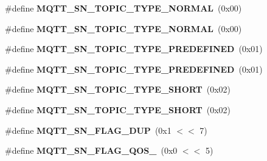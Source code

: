 \begin{DoxyCompactItemize}
\item 
\hypertarget{group__MQTT__SN__CONTROL_ga206c51c6b01cdf9347809ebfc03caaef}{\#define {\bfseries M\+Q\+T\+T\+\_\+\+S\+N\+\_\+\+T\+O\+P\+I\+C\+\_\+\+T\+Y\+P\+E\+\_\+\+N\+O\+R\+M\+A\+L}~(0x00)}\label{group__MQTT__SN__CONTROL_ga206c51c6b01cdf9347809ebfc03caaef}

\item 
\hypertarget{group__MQTT__SN__CONTROL_ga206c51c6b01cdf9347809ebfc03caaef}{\#define {\bfseries M\+Q\+T\+T\+\_\+\+S\+N\+\_\+\+T\+O\+P\+I\+C\+\_\+\+T\+Y\+P\+E\+\_\+\+N\+O\+R\+M\+A\+L}~(0x00)}\label{group__MQTT__SN__CONTROL_ga206c51c6b01cdf9347809ebfc03caaef}

\item 
\hypertarget{group__MQTT__SN__CONTROL_ga655ae15e8e7734cedf42fab6eb3610b5}{\#define {\bfseries M\+Q\+T\+T\+\_\+\+S\+N\+\_\+\+T\+O\+P\+I\+C\+\_\+\+T\+Y\+P\+E\+\_\+\+P\+R\+E\+D\+E\+F\+I\+N\+E\+D}~(0x01)}\label{group__MQTT__SN__CONTROL_ga655ae15e8e7734cedf42fab6eb3610b5}

\item 
\hypertarget{group__MQTT__SN__CONTROL_ga655ae15e8e7734cedf42fab6eb3610b5}{\#define {\bfseries M\+Q\+T\+T\+\_\+\+S\+N\+\_\+\+T\+O\+P\+I\+C\+\_\+\+T\+Y\+P\+E\+\_\+\+P\+R\+E\+D\+E\+F\+I\+N\+E\+D}~(0x01)}\label{group__MQTT__SN__CONTROL_ga655ae15e8e7734cedf42fab6eb3610b5}

\item 
\hypertarget{group__MQTT__SN__CONTROL_gaa17c2076a81b61d2719199521563d1c5}{\#define {\bfseries M\+Q\+T\+T\+\_\+\+S\+N\+\_\+\+T\+O\+P\+I\+C\+\_\+\+T\+Y\+P\+E\+\_\+\+S\+H\+O\+R\+T}~(0x02)}\label{group__MQTT__SN__CONTROL_gaa17c2076a81b61d2719199521563d1c5}

\item 
\hypertarget{group__MQTT__SN__CONTROL_gaa17c2076a81b61d2719199521563d1c5}{\#define {\bfseries M\+Q\+T\+T\+\_\+\+S\+N\+\_\+\+T\+O\+P\+I\+C\+\_\+\+T\+Y\+P\+E\+\_\+\+S\+H\+O\+R\+T}~(0x02)}\label{group__MQTT__SN__CONTROL_gaa17c2076a81b61d2719199521563d1c5}

\item 
\hypertarget{group__MQTT__SN__CONTROL_ga2d49bf6469a7864f24a537f059ee0612}{\#define {\bfseries M\+Q\+T\+T\+\_\+\+S\+N\+\_\+\+F\+L\+A\+G\+\_\+\+D\+U\+P}~(0x1 $<$$<$ 7)}\label{group__MQTT__SN__CONTROL_ga2d49bf6469a7864f24a537f059ee0612}

\item 
\hypertarget{group__MQTT__SN__CONTROL_ga37b57822f47fbb4ba1639e5be988c437}{\#define {\bfseries M\+Q\+T\+T\+\_\+\+S\+N\+\_\+\+F\+L\+A\+G\+\_\+\+Q\+O\+S\+\_}~(0x0 $<$$<$ 5)}\label{group__MQTT__SN__CONTROL_ga37b57822f47fbb4ba1639e5be988c437}


\end{DoxyCompactItemize}
